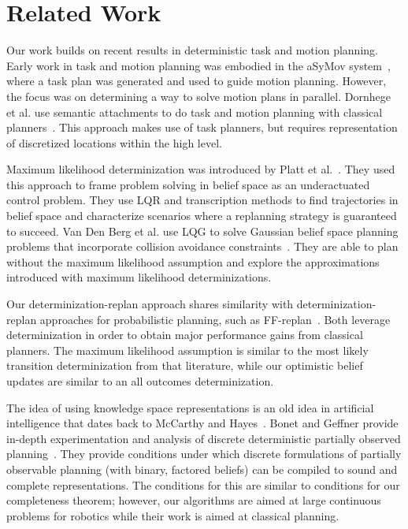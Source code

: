 \section{Related Work}
Our work builds on recent results in deterministic task and motion
planning. Early work in task and motion planning was embodied in the
aSyMov system~\cite{gravot2005asymov}, where a task plan was generated
and used to guide motion planning. However, the focus was on
determining a way to solve motion plans in parallel. Dornhege et
al. use semantic attachments to do task and motion planning with
classical planners~\cite{dornhege2012semantic}. This approach makes
use of task planners, but requires representation of discretized
locations within the high level. 


Maximum likelihood determinization was introduced by Platt et
al.~\cite{platt2010belief}. They used this approach to frame problem
solving in belief space as an underactuated control problem. They use
LQR and transcription methods to find trajectories in belief space and
characterize scenarios where a replanning strategy is guaranteed to
succeed. Van Den Berg et al. use LQG to solve Gaussian belief space
planning problems that incorporate collision avoidance
constraints~\cite{van2012motion}. They are able to plan without
the maximum likelihood assumption and explore the approximations
introduced with maximum likelihood determinizations.

Our determinization-replan approach shares similarity with
determinization-replan approaches for probabilistic planning, such as
FF-replan~\cite{yoon2007ff}. Both leverage determinization in order to
obtain major performance gains from classical planners. The maximum
likelihood assumption is similar to the most likely transition
determinization from that literature, while our optimistic belief
updates are similar to an all outcomes determinization.

The idea of using knowledge space representations is an old idea in
artificial intelligence that dates back to McCarthy and
Hayes~\cite{mccarthy1968some}. Bonet and Geffner provide in-depth
experimentation and analysis of discrete deterministic partially
observed planning~\cite{bonet2011planning}.  They provide conditions
under which discrete formulations of partially observable planning
(with binary, factored beliefs) can be compiled to sound and complete
representations. The conditions for this are similar to conditions
for our completeness theorem; however, our algorithms are aimed at
large continuous problems for robotics while their work is aimed at
classical planning.

